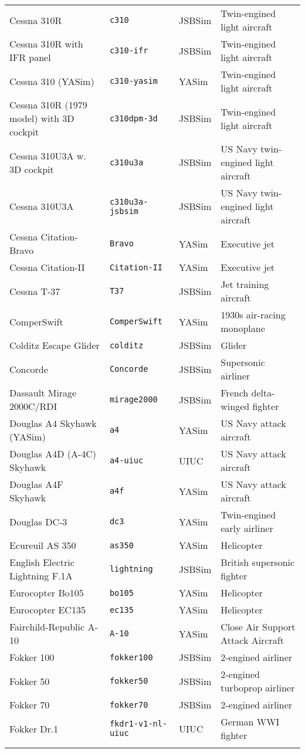\begin{tabular}{l|l|l|l}
   Cessna 310R & \texttt{c310} & JSBSim & Twin-engined light aircraft\\
   Cessna 310R with IFR panel & \texttt{c310-ifr} & JSBSim & Twin-engined light aircraft\\
   Cessna 310 (YASim) & \texttt{c310-yasim} & YASim & Twin-engined light aircraft\\
   Cessna 310R (1979 model) with 3D cockpit & \texttt{c310dpm-3d} & JSBSim & Twin-engined light aircraft\\
   Cessna 310U3A w. 3D cockpit & \texttt{c310u3a} & JSBSim & US Navy twin-engined light aircraft\\
   Cessna 310U3A & \texttt{c310u3a-jsbsim} & JSBSim & US Navy twin-engined light aircraft\\
   Cessna Citation-Bravo & \texttt{Bravo} & YASim  &  Executive jet\\
   Cessna Citation-II & \texttt{Citation-II} & YASim & Executive jet\\
   Cessna T-37 & \texttt{T37} & JSBSim & Jet training aircraft\\
   ComperSwift      & \texttt{ComperSwift} & YASim  &  1930s air-racing monoplane\\
   Colditz Escape Glider & \texttt{colditz} & JSBSim & Glider\\
   Concorde         & \texttt{Concorde}   & JSBSim  &  Supersonic airliner\\
   Dassault Mirage 2000C/RDI & \texttt{mirage2000} & JSBSim & French delta-winged fighter\\
   Douglas A4 Skyhawk (YASim) & \texttt{a4} & YASim & US Navy attack aircraft\\
   Douglas A4D (A-4C) Skyhawk & \texttt{a4-uiuc} & UIUC & US Navy attack aircraft\\
   Douglas A4F Skyhawk & \texttt{a4f} & YASim & US Navy attack aircraft\\
   Douglas DC-3 & \texttt{dc3} & YASim & Twin-engined early airliner\\
   Ecureuil AS 350 & \texttt{as350} & YASim & Helicopter\\
   English Electric Lightning F.1A & \texttt{lightning} & JSBSim & British supersonic fighter\\
   Eurocopter Bo105 & \texttt{bo105} & YASim & Helicopter \\
   Eurocopter EC135 & \texttt{ec135} & YASim & Helicopter\\
   Fairchild-Republic A-10 & \texttt{A-10}  & YASim  & Close Air Support Attack Aircraft \\
   Fokker 100 & \texttt{fokker100} & JSBSim & 2-engined airliner\\
   Fokker 50 & \texttt{fokker50} & JSBSim & 2-engined turboprop airliner\\
   Fokker 70 & \texttt{fokker70} & JSBSim & 2-engined airliner\\
   Fokker Dr.1 & \texttt{fkdr1-v1-nl-uiuc} & UIUC & German WWI fighter\\
   \\
\end{tabular}
